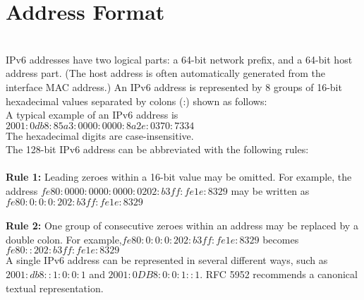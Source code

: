 \documentclass[12pt]{article}
\begin{document}
\section{Address Format}\\
IPv6 addresses have two logical parts: a 64-bit network prefix, and a 64-bit host address part. (The host address is often automatically generated from the interface MAC address.) An IPv6 address is represented by 8 groups of 16-bit hexadecimal values separated by colons (:) shown as follows:\\
A typical example of an IPv6 address is $2001:0db8:85a3:0000:0000:8a2e:0370:7334$\\
The hexadecimal digits are case-insensitive.\\
The 128-bit IPv6 address can be abbreviated with the following rules:\\\\
{\bf Rule 1:} Leading zeroes within a 16-bit value may be omitted. For example, the address $fe80:0000:0000:0000:0202:b3ff:fe1e:8329$ may be written as $fe80:0:0:0:202:b3ff:fe1e:8329$\\\\
{\bf Rule 2:} One group of consecutive zeroes within an address may be replaced by a double colon. For example,$fe80:0:0:0:202:b3ff:fe1e:8329$ becomes $fe80::202:b3ff:fe1e:8329$\\
A single IPv6 address can be represented in several different ways, such as $2001:db8::1:0:0:1$ and $2001:0DB8:0:0:1::1$. RFC 5952 recommends a canonical textual representation.\\
\end{document}
